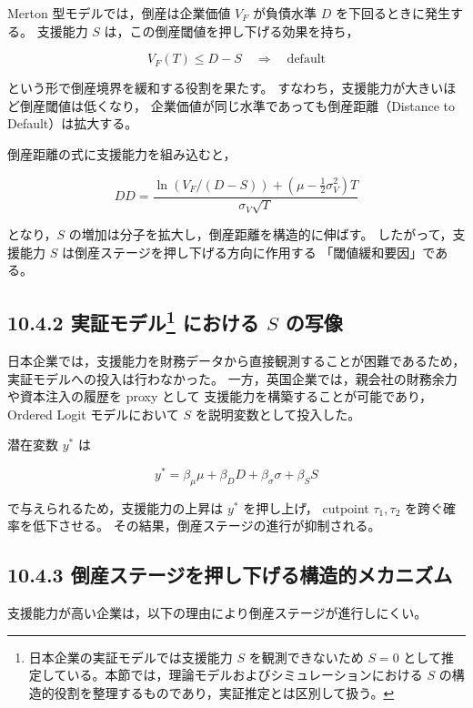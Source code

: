 Merton 型モデルでは，倒産は企業価値 $V_F$ が負債水準 $D$ を下回るときに発生する。
支援能力 $S$ は，この倒産閾値を押し下げる効果を持ち，



\[
V_F(T) \leq D - S \quad \Rightarrow \quad \text{default}
\]



という形で倒産境界を緩和する役割を果たす。
すなわち，支援能力が大きいほど倒産閾値は低くなり，
企業価値が同じ水準であっても倒産距離（Distance to Default）は拡大する。

倒産距離の式に支援能力を組み込むと，



\[
DD = \frac{\ln(V_F/(D-S)) + (\mu - \frac{1}{2}\sigma_V^2)T}{\sigma_V\sqrt{T}}
\]



となり，$S$ の増加は分子を拡大し，倒産距離を構造的に伸ばす。
したがって，支援能力 $S$ は倒産ステージを押し下げる方向に作用する
「閾値緩和要因」である。

\subsection*{10.4.2 実証モデル\footnote{日本企業の実証モデルでは支援能力 $S$ を観測できないため
$S=0$ として推定している。本節では，理論モデルおよびシミュレーションにおける
$S$ の構造的役割を整理するものであり，実証推定とは区別して扱う。}
における $S$ の写像}

日本企業では，支援能力を財務データから直接観測することが困難であるため，
実証モデルへの投入は行わなかった。
一方，英国企業では，親会社の財務余力や資本注入の履歴を proxy として
支援能力を構築することが可能であり，
Ordered Logit モデルにおいて $S$ を説明変数として投入した。

潜在変数 $y^*$ は



\[
y^* = \beta_\mu \mu + \beta_D D + \beta_\sigma \sigma + \beta_S S
\]



で与えられるため，支援能力の上昇は $y^*$ を押し上げ，
cutpoint $\tau_1, \tau_2$ を跨ぐ確率を低下させる。
その結果，倒産ステージの進行が抑制される。

\subsection*{10.4.3 倒産ステージを押し下げる構造的メカニズム}

支援能力が高い企業は，以下の理由により倒産ステージが進行しにくい。

